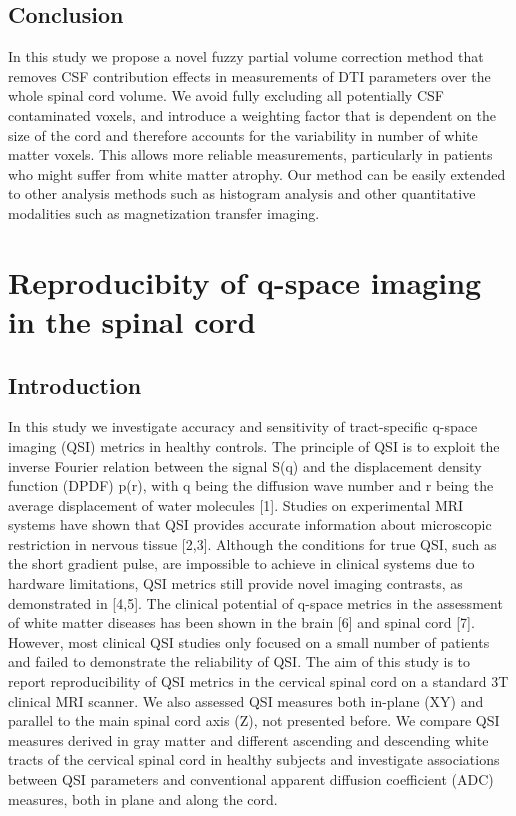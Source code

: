 \subsection*{Conclusion} In this study we propose a novel fuzzy partial volume correction method that removes CSF contribution effects in measurements of DTI parameters over the whole spinal cord volume. We avoid fully excluding all potentially CSF contaminated voxels, and introduce a weighting factor that is dependent on the size of the cord and therefore accounts for the variability in number of white matter voxels. This allows more reliable measurements, particularly in patients who might suffer from white matter atrophy. Our method can be easily extended to other analysis methods such as histogram analysis and other quantitative modalities such as magnetization transfer imaging.

\section{Reproducibity of q-space imaging in the spinal cord} 
\subsection*{Introduction} In this study we investigate accuracy and sensitivity of tract-specific q-space imaging (QSI) metrics in healthy controls. The principle of QSI is to exploit the inverse Fourier relation between the signal S(q) and the displacement density function (DPDF) p(r), with q being the diffusion wave number and r being the average displacement of water molecules [1]. Studies on experimental MRI systems have shown that QSI provides accurate information about microscopic restriction in nervous tissue [2,3]. Although the conditions for true QSI, such as the short gradient pulse, are impossible to achieve in clinical systems due to hardware limitations, QSI metrics still provide novel imaging contrasts, as demonstrated in [4,5]. The clinical potential of q-space metrics in the assessment of white matter diseases has been shown in the brain [6] and spinal cord [7]. However, most clinical QSI studies only focused on a small number of patients and failed to demonstrate the reliability of QSI. The aim of this study is to report reproducibility of QSI metrics in the cervical spinal cord on a standard 3T clinical MRI scanner. We also assessed QSI measures both in-plane (XY) and parallel to the main spinal cord axis (Z), not presented before. We compare QSI measures derived in gray matter and different ascending and descending white tracts of the cervical spinal cord in healthy subjects and investigate associations between QSI parameters and conventional apparent diffusion coefficient (ADC) measures, both in plane and along the cord. 
